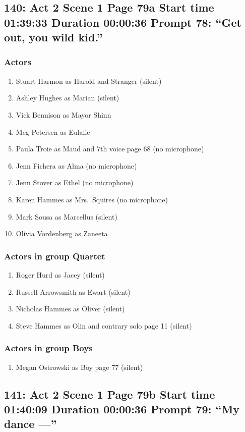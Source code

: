 \subsection{140: Act 2 Scene 1 Page 79a Start time 01:39:33 Duration 00:00:36 Prompt 78: ``Get out, you wild kid.''}

\subsubsection{Actors}
\begin{enumerate}
\item Stuart Harmon as Harold and Stranger (silent)
\item Ashley Hughes as Marian (silent)
\item Vick Bennison as Mayor Shinn
\item Meg Petersen as Eulalie
\item Paula Troie as Maud and 7th voice page 68 (no microphone)
\item Jenn Fichera as Alma (no microphone)
\item Jenn Stover as Ethel (no microphone)
\item Karen Hammes as Mrs.~Squires (no microphone)
\item Mark Sousa as Marcellus (silent)
\item Olivia Vordenberg as Zaneeta
\end{enumerate}
\subsubsection{Actors in group Quartet}
\begin{enumerate}
\item Roger Hurd as Jacey (silent)
\item Russell Arrowsmith as Ewart (silent)
\item Nicholas Hammes as Oliver (silent)
\item Steve Hammes as Olin and contrary solo page 11 (silent)
\end{enumerate}
\subsubsection{Actors in group Boys}
\begin{enumerate}
\item Megan Ostrowski as Boy page 77 (silent)
\end{enumerate}


\subsection{141: Act 2 Scene 1 Page 79b Start time 01:40:09 Duration 00:00:36 Prompt 79: ``My dance ---''}


